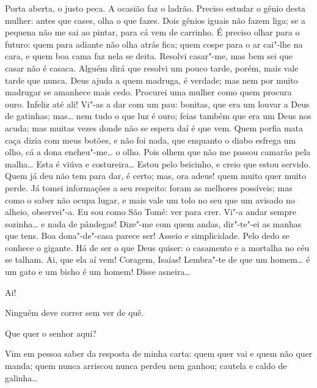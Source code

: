 \begin{linenumbers}
  Porta
aberta, o justo peca.
 A ocasião faz o ladrão. Preciso estudar o
gênio desta mulher: antes que cases, olha o que fazes. Dois gênios iguais não
fazem liga; se a pequena não me sai ao pintar, para cá vem de carrinho. É
preciso olhar para o futuro: quem para adiante não olha atrás fica; quem cospe
para o ar cai"-lhe na cara, e quem boa cama faz nela se deita. Resolvi casar"-me,
mas bem sei que casar não é casaca. Alguém dirá que resolvi um pouco tarde,
porém, mais vale tarde que nunca. Deus ajuda a quem madruga, é verdade; mas nem
por muito madrugar se amanhece mais cedo. Procurei uma mulher como quem procura
ouro. Infeliz até ali! Vi"-as a dar com um pau: bonitas, que era um louvar a Deus
de gatinhas; mas\ldots{} nem tudo o que luz é ouro; feias também que era um Deus
nos acuda; mas muitas vezes donde não se espera daí é que vem. Quem porfia mata
caça dizia com meus botões, e não foi nada, que enquanto o diabo esfrega um
olho, cá a dona encheu"-me\ldots{} o olho. Pois olhem que não me passou camarão
pela malha\ldots{} Esta é viúva e costureira\ldots{} Estou pelo beicinho, e creio
que estou servido. Quem já deu não tem para dar, é certo; mas, ora adeus!
quem muito quer muito perde. Já tomei informações a seu respeito: foram as
melhores possíveis; mas como o saber não ocupa lugar, e mais vale um tolo no seu
que um avisado no alheio, observei"-a. Eu sou como
São Tomé: ver para crer. Vi"-a andar sempre sozinha\ldots{} e nada de pândegas!
Dize"-me com quem andas, dir"-te"-ei as manhas que tens.
 Boa dona"-de"-casa parece ser! Asseio e simplicidade.
Pelo dedo se conhece o gigante. Há de ser o que Deus quiser: o casamento e a
mortalha no céu se talham.  Ai, que ela aí vem!
 Coragem, Isaías! Lembra"-te de que um homem\ldots{}
 é um gato e um bicho é um homem!
Disse asneira\ldots{}




  Ai!

   Ninguém deve correr sem ver
de quê.

  Que quer o senhor aqui?

  Vim em pessoa saber da resposta de minha carta: quem quer vai e
quem não quer manda; quem nunca arriscou nunca perdeu nem ganhou; cautela e
caldo de galinha\ldots{}


\end{linenumbers}
